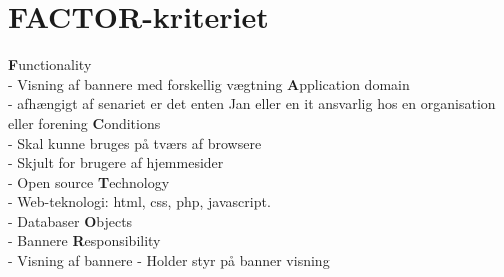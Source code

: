 \documentclass[a4paper,12pt]{article}
\begin{document}
\section{FACTOR-kriteriet}

\large{\bf{F}}\normalsize{unctionality
\\
- Visning af bannere med forskellig vægtning}
\newline
\newline
\large{\bf{A}}\normalsize{pplication domain
\\
- afhængigt af senariet er det enten Jan eller en it ansvarlig hos en organisation eller forening}
\newline
\newline
\large{\bf{C}}\normalsize{onditions\\
- Skal kunne bruges på tværs af browsere\\
- Skjult for brugere af hjemmesider\\
- Open source}
\newline
\newline
\large{\bf{T}}\normalsize{echnology\\
- Web-teknologi: html, css, php, javascript.\\
- Databaser}
\newline
\newline
\large{\bf{O}}\normalsize{bjects\\
- Bannere}
\newline
\newline
\large{\bf{R}}\normalsize{esponsibility\\
- Visning af bannere
- Holder styr på banner visning}

\newpage
\end{document}
